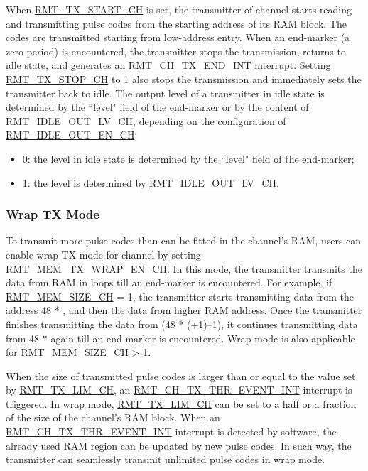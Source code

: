\documentclass[main\_\_EN.tex]{subfiles}
\begin{document}
When \hyperref[fielddesc:RMTTXSTARTCHN]{RMT\_TX\_START\_CH} is set, the transmitter of channel  starts reading and transmitting pulse codes from the starting address of its RAM block. The codes are transmitted starting from low-address entry. 
When an end-marker (a zero period) is encountered, the transmitter stops the transmission, returns to idle state, and generates an  \hyperref[int:RMTCHNTXENDINT]{RMT\_CH\_TX\_END\_INT} interrupt. Setting \hyperref[fielddesc:RMTTXSTOPCHN]{RMT\_TX\_STOP\_CH} to 1 also stops the transmission and immediately sets the transmitter back to idle. 
The output level of a transmitter in idle state is determined by the ``level" field of the end-marker or by the content of  \hyperref[fielddesc:RMTIDLEOUTLVCHN]{RMT\_IDLE\_OUT\_LV\_CH}, depending on the configuration of \hyperref[fielddesc:RMTIDLEOUTENCHN]{RMT\_IDLE\_OUT\_EN\_CH}:
\begin{itemize}
    \item 0: the level in idle state is determined by the ``level" field of the end-marker;
    \item 1: the level is determined by \hyperref[fielddesc:RMTIDLEOUTLVCHN]{RMT\_IDLE\_OUT\_LV\_CH}.
\end{itemize}


\subsubsection{Wrap TX Mode}\label{sec:wrap-tx-mode}

To transmit more pulse codes than can be fitted in the channel's RAM, users can enable wrap TX mode for channel  by setting \hyperref[fielddesc:RMTMEMTXWRAPENCHN]{RMT\_MEM\_TX\_WRAP\_EN\_CH}. In this mode, the transmitter transmits the data from RAM in loops till an end-marker is encountered.
For example, if \hyperref[fielddesc:RMTMEMSIZECHN]{RMT\_MEM\_SIZE\_CH} = 1, the transmitter starts transmitting data from the address 48 * , and then the data from higher RAM address. Once the transmitter finishes transmitting the data from (48 * (+1)$–$1), it continues transmitting data from 48 *  again till an end-marker is encountered. Wrap mode is also applicable for \hyperref[fielddesc:RMTMEMSIZECHN]{RMT\_MEM\_SIZE\_CH} > 1.

When the size of transmitted pulse codes is larger than or equal to the value set by  \hyperref[fielddesc:RMTTXLIMCHN]{RMT\_TX\_LIM\_CH}, an \hyperref[int:RMTCHNTXTHREVENTINT]{RMT\_CH\_TX\_THR\_EVENT\_INT} interrupt is triggered. In wrap mode,  \hyperref[fielddesc:RMTTXLIMCHN]{RMT\_TX\_LIM\_CH} can be set to a half or a fraction of the size of the channel's RAM block. When an  \hyperref[int:RMTCHNTXTHREVENTINT]{RMT\_CH\_TX\_THR\_EVENT\_INT} interrupt is detected by software, the already used RAM region can be updated by new pulse codes. In such way, the transmitter can seamlessly transmit unlimited pulse codes in wrap mode.
\end{document}

